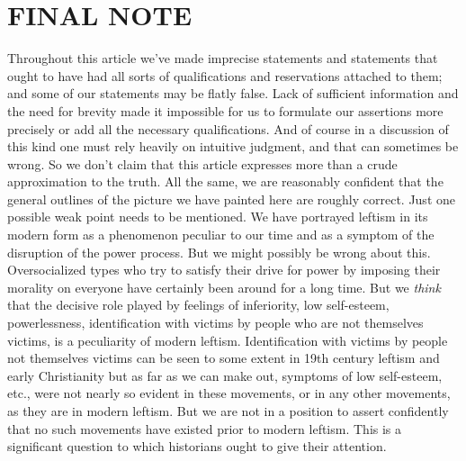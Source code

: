\chapter{FINAL NOTE}

 Throughout this article we’ve made imprecise statements and statements that ought to have had all sorts of qualifications and reservations attached to them; and some of our statements may be flatly false. Lack of sufficient information and the need for brevity made it impossible for us to formulate our assertions more precisely or add all the necessary qualifications. And of course in a discussion of this kind one must rely heavily on intuitive judgment, and that can sometimes be wrong. So we don’t claim that this article expresses more than a crude approximation to the truth.
 All the same, we are reasonably confident that the general outlines of the picture we have painted here are roughly correct. Just one possible weak point needs to be mentioned. We have portrayed leftism in its modern form as a phenomenon peculiar to our time and as a symptom of the disruption of the power process. But we might possibly be wrong about this. Oversocialized types who try to satisfy their drive for power by imposing their morality on everyone have certainly been around for a long time. But we {\em think} that the decisive role played by feelings of inferiority, low self-esteem, powerlessness, identification with victims by people who are not themselves victims, is a peculiarity of modern leftism. Identification with victims by people not themselves victims can be seen to some extent in 19th century leftism and early Christianity but as far as we can make out, symptoms of low self-esteem, etc., were not nearly so evident in these movements, or in any other movements, as they are in modern leftism. But we are not in a position to assert confidently that no such movements have existed prior to modern leftism. This is a significant question to which historians ought to give their attention.
